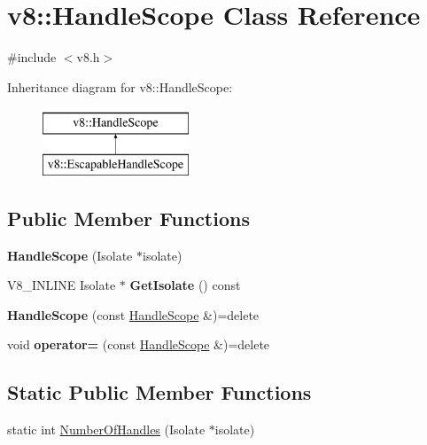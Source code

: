 \hypertarget{classv8_1_1HandleScope}{}\section{v8\+:\+:Handle\+Scope Class Reference}
\label{classv8_1_1HandleScope}


{\ttfamily \#include $<$v8.\+h$>$}

Inheritance diagram for v8\+:\+:Handle\+Scope\+:\begin{figure}[H]
\begin{center}
\leavevmode
\includegraphics[height=2.000000cm]{classv8_1_1HandleScope}
\end{center}
\end{figure}
\subsection*{Public Member Functions}
\begin{DoxyCompactItemize}
\item 
\mbox{\label{classv8_1_1HandleScope_afdb3053d852ea467f026b025ed431e79}} 
{\bfseries Handle\+Scope} (Isolate $\ast$isolate)
\item 
\mbox{\label{classv8_1_1HandleScope_ad605be00a8f9bfd8157806102af95fab}} 
V8\+\_\+\+I\+N\+L\+I\+NE Isolate $\ast$ {\bfseries Get\+Isolate} () const
\item 
\mbox{\label{classv8_1_1HandleScope_a8354f068f3185cb663ecb689587fbbe8}} 
{\bfseries Handle\+Scope} (const \mbox{\hyperlink{classv8_1_1HandleScope}{Handle\+Scope}} \&)=delete
\item 
\mbox{\label{classv8_1_1HandleScope_a6570b4a527ee30057026a15f3ebe62b2}} 
void {\bfseries operator=} (const \mbox{\hyperlink{classv8_1_1HandleScope}{Handle\+Scope}} \&)=delete
\end{DoxyCompactItemize}
\subsection*{Static Public Member Functions}
\begin{DoxyCompactItemize}
\item 
static int \mbox{\hyperlink{classv8_1_1HandleScope_abab7214c9b9388b02f575fd5270b7e2f}{Number\+Of\+Handles}} (Isolate $\ast$isolate)
\end{DoxyCompactItemize}
